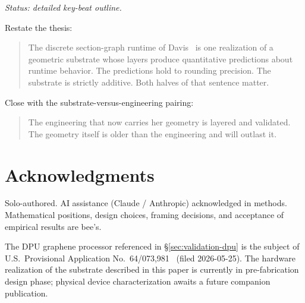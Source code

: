 \documentclass[11pt,letterpaper]{article}
\begin{document}
\noindent\emph{Status: detailed key-beat outline.}

Restate the thesis:

\begin{quote}
The discrete section-graph runtime of
Davis~\cite{davis2026sheafcomposition} is one realization of a
geometric substrate whose layers produce quantitative predictions
about runtime behavior. The predictions hold to rounding precision.
The substrate is strictly additive. Both halves of that sentence
matter.
\end{quote}

Close with the substrate-versus-engineering pairing:

\begin{quote}
The engineering that now carries her geometry is layered and
validated. The geometry itself is older than the engineering and
will outlast it.
\end{quote}


\section*{Acknowledgments}

Solo-authored. AI assistance (Claude / Anthropic) acknowledged in
methods. Mathematical positions, design choices, framing decisions,
and acceptance of empirical results are bee's.

The DPU graphene processor referenced in
\S\ref{sec:validation-dpu} is the subject of U.S.\ Provisional
Application No.~64/073,981~\cite{davis2026dpu} (filed 2026-05-25).
The hardware realization of the substrate described in this paper is
currently in pre-fabrication design phase; physical device
characterization awaits a future companion publication.
\end{document}
